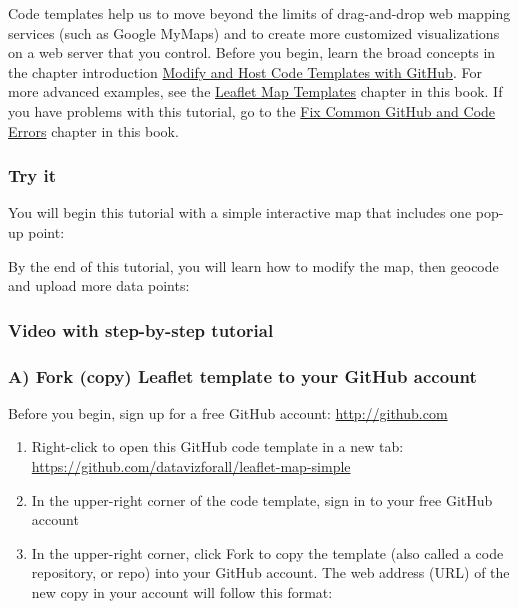 \documentclass[
  english,
]{book}
\begin{document}
Code templates help us to move beyond the limits of drag-and-drop web mapping services (such as Google MyMaps) and to create more customized visualizations on a web server that you control. Before you begin, learn the broad concepts in the chapter introduction \href{github}{Modify and Host Code Templates with GitHub}. For more advanced examples, see the \href{leaflet}{Leaflet Map Templates} chapter in this book. If you have problems with this tutorial, go to the \href{fix-code}{Fix Common GitHub and Code Errors} chapter in this book.

\hypertarget{try-it-6}{%
\subsubsection*{Try it}\label{try-it-6}}

You will begin this tutorial with a simple interactive map that includes one pop-up point:

By the end of this tutorial, you will learn how to modify the map, then geocode and upload more data points:

\hypertarget{video-with-step-by-step-tutorial-6}{%
\subsubsection*{Video with step-by-step tutorial}\label{video-with-step-by-step-tutorial-6}}

\hypertarget{a-fork-copy-leaflet-template-to-your-github-account}{%
\subsubsection*{A) Fork (copy) Leaflet template to your GitHub account}\label{a-fork-copy-leaflet-template-to-your-github-account}}

Before you begin, sign up for a free GitHub account: \url{http://github.com}

\begin{enumerate}
\def\labelenumi{\arabic{enumi})}
\item
  Right-click to open this GitHub code template in a new tab: \url{https://github.com/datavizforall/leaflet-map-simple}
\item
  In the upper-right corner of the code template, sign in to your free GitHub account
\item
  In the upper-right corner, click Fork to copy the template (also called a code repository, or repo) into your GitHub account. The web address (URL) of the new copy in your account will follow this format:
\end{enumerate}
\end{document}

